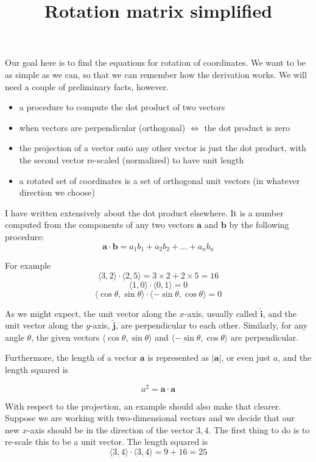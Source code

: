 \documentclass[11pt, oneside]{article}   	%
\title{Rotation matrix simplified}
\date{}							%
\begin{document}
\maketitle
\Large
\noindent
Our goal here is to find the equations for rotation of coordinates.  We want to be as simple as we can, so that we can remember how the derivation works.  We will need a couple of preliminary facts, however.

\begin{itemize}
\item a procedure to compute the dot product of two vectors
\item when vectors are perpendicular (orthogonal) $\iff$ the dot product is zero
\item the projection of a vector onto any other vector is just the dot product, with the second vector re-scaled (normalized) to have unit length
\item a rotated set of coordinates is a set of orthogonal unit vectors (in whatever direction we choose)
\end{itemize}

I have written extensively about the dot product elsewhere.  It is a number computed from the components of any two vectors $\mathbf{a}$ and $\mathbf{b}$ by the following procedure:
\[ \mathbf{a} \cdot \mathbf{b} = a_1 b_1 + a_2 b_2 + \dots + a_n b_n \]

For example
\[ \langle 3, 2 \rangle \cdot  \langle 2, 5 \rangle = 3 \times 2 + 2 \times 5 = 16 \]
\[ \langle 1, 0 \rangle \cdot  \langle 0, 1 \rangle = 0 \]
\[ \langle \cos \theta, \sin \theta \rangle \cdot  \langle -\sin \theta, \cos \theta \rangle = 0 \]

As we might expect, the unit vector along the $x$-axis, usually called $\hat{\mathbf{i}}$, and the unit vector along the $y$-axis, $\hat{\mathbf{j}}$, are perpendicular to each other.  Similarly, for any angle $\theta$, the given vectors $\langle \cos \theta, \sin \theta \rangle$ and $\langle -\sin \theta, \cos \theta \rangle$ are perpendicular.

Furthermore, the length of a vector $\mathbf{a}$ is represented as $|\mathbf{a}|$, or even just $a$, and the length squared is

\[ a^2 = \mathbf{a} \cdot \mathbf{a} \]

With respect to the projection, an example should also make that clearer.  Suppose we are working with two-dimensional vectors and we decide that our new $x$-axis should be in the direction of the vector $3,4$.  The first thing to do is to re-scale this to be a unit vector.  The length squared is
\[ \langle 3, 4 \rangle \cdot  \langle 3, 4 \rangle = 9 + 16 = 25 \]
\end{document}
